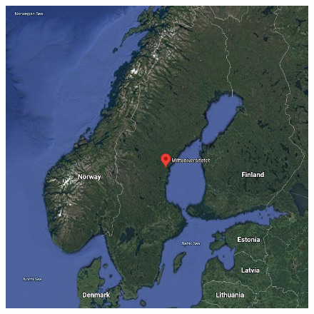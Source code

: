 \begin{frame}
\begin{figure}
{    \includegraphics[height=0.35\textheight]{fig/miun-map.png}}
\end{figure}
\end{frame}
